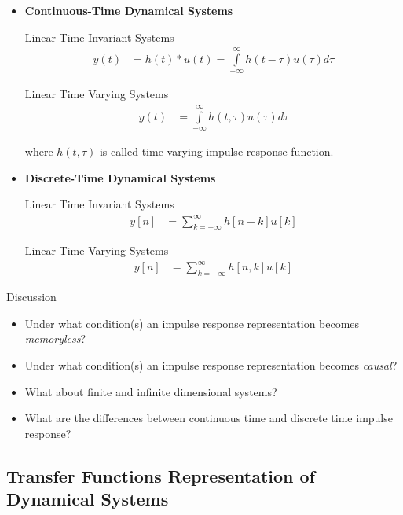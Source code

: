 \documentclass[twoside]{article}
\begin{document}
\begin{itemize}

\item \textbf{Continuous-Time Dynamical Systems}

Linear Time Invariant Systems
%
\begin{align*}
  y(t) &= h(t) \ast u(t) = \int\limits_{-\infty}^{\infty} h(t-\tau) u(\tau) d\tau 
\end{align*}

Linear Time Varying Systems
%
\begin{align*}
  y(t) &= \int\limits_{-\infty}^{\infty} h(t,\tau) u(\tau) d\tau 
\end{align*}

\noindent where $h(t,\tau)$ is called time-varying impulse response
function.


\vspace{12pt}

\item \textbf{Discrete-Time Dynamical Systems}

Linear Time Invariant Systems
%
\begin{align*}
  y[n] &= \sum\limits_{k = -\infty}^{\infty} h[n -k] u[k] 
\end{align*}

Linear Time Varying Systems
%
\begin{align*}
  y[n] &= \sum\limits_{k = -\infty}^{\infty} h[n,k] u[k] 
\end{align*}

\end{itemize}

Discussion

\vspace{6pt}

\begin{itemize}
  \item Under what condition(s) an impulse response representation 
    becomes \textit{memoryless}?
  \item Under what condition(s) an impulse response representation 
    becomes \textit{causal}?
  \item What about finite and infinite dimensional systems?
  \item What are the differences between continuous time and discrete
    time impulse response?
\end{itemize}

\subsection{Transfer Functions Representation of Dynamical Systems}
\end{document}
